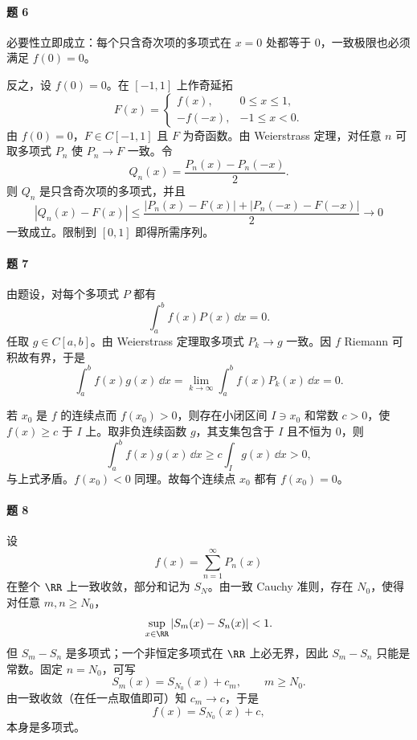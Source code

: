 \paragraph{题 6}
\begin{xsolution}
必要性立即成立：每个只含奇次项的多项式在 $x=0$ 处都等于 0，一致极限也必须满足 $f(0)=0$。

反之，设 $f(0)=0$。在 $[-1,1]$ 上作奇延拓
\[
  F(x)=
  \begin{cases}
    f(x),&0\leqslant x\leqslant1,\\
    -f(-x),&-1\leqslant x<0.
  \end{cases}
\]
由 $f(0)=0$，$F\in C[-1,1]$ 且 $F$ 为奇函数。由 Weierstrass 定理，对任意 $n$ 可取多项式 $P_n$ 使 $P_n\to F$ 一致。令
\[
  Q_n(x)=\frac{P_n(x)-P_n(-x)}2.
\]
则 $Q_n$ 是只含奇次项的多项式，并且
\[
  |Q_n(x)-F(x)|
  \leqslant\frac{|P_n(x)-F(x)|+|P_n(-x)-F(-x)|}{2}
  \to0
\]
一致成立。限制到 $[0,1]$ 即得所需序列。
\end{xsolution}

\paragraph{题 7}
\begin{xsolution}
由题设，对每个多项式 $P$ 都有
\[
  \int_a^bf(x)P(x)\,\dd x=0.
\]
任取 $g\in C[a,b]$。由 Weierstrass 定理取多项式 $P_k\to g$ 一致。因 $f$ Riemann 可积故有界，于是
\[
  \int_a^bf(x)g(x)\,\dd x
  =\lim_{k\to\infty}\int_a^bf(x)P_k(x)\,\dd x=0.
\]

若 $x_0$ 是 $f$ 的连续点而 $f(x_0)>0$，则存在小闭区间 $I\ni x_0$ 和常数 $c>0$，使 $f(x)\geqslant c$ 于 $I$ 上。取非负连续函数 $g$，其支集包含于 $I$ 且不恒为 0，则
\[
  \int_a^bf(x)g(x)\,\dd x\geqslant c\int_Ig(x)\,\dd x>0,
\]
与上式矛盾。$f(x_0)<0$ 同理。故每个连续点 $x_0$ 都有 $f(x_0)=0$。
\end{xsolution}

\paragraph{题 8}
\begin{xsolution}
设
\[
  f(x)=\sum_{n=1}^{\infty}P_n(x)
\]
在整个 $\RR$ 上一致收敛，部分和记为 $S_N$。由一致 Cauchy 准则，存在 $N_0$，使得对任意 $m,n\geqslant N_0$，
\[
  \sup_{x\in\RR}|S_m(x)-S_n(x)|<1.
\]
但 $S_m-S_n$ 是多项式；一个非恒定多项式在 $\RR$ 上必无界，因此 $S_m-S_n$ 只能是常数。固定 $n=N_0$，可写
\[
  S_m(x)=S_{N_0}(x)+c_m,
  \qquad m\geqslant N_0.
\]
由一致收敛（在任一点取值即可）知 $c_m\to c$，于是
\[
  f(x)=S_{N_0}(x)+c,
\]
本身是多项式。
\end{xsolution}

